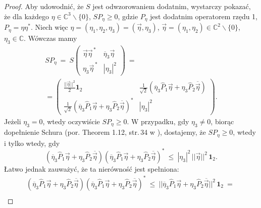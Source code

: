 \begin{proof}
Aby udowodnić, że $S$ jest odwzorowaniem dodatnim,
wystarczy pokazać, że dla każdego $\eta \in \mathbb{C}^{3}\backslash\{0\}$,
$SP_{\eta} \geq 0$,
gdzie $P_{\eta}$ jest dodatnim operatorem rzędu 1,
$P_{\eta} = \eta \eta^{*}$.
Niech więc
$\eta = (\eta_{1}, \eta_{2}, \eta_{3}) = (\vec{\eta}, \eta_{3})$,
$\vec{\eta} = (\eta_{1}, \eta_{2}) \in \mathbb{C}^{2}\backslash\{0\}$,
$\eta_{3} \in \mathbb{C}$.
Wówczas mamy
\begin{multline}
 SP_{\eta} \:=\:  S \begin{pmatrix}
    \vec{\eta} \vec{\eta}^{\,*} & \overline{\eta}_{3} \vec{\eta} \\
    \eta_{3} \vec{\eta}^{\,*}   & |\eta_{3}|^{2}
 \end{pmatrix} \: = \: \\
 = \begin{pmatrix}
  \frac{||\vec{\eta}||^{2}}{2} \mathbf{1}_{2} &
        \frac{1}{\sqrt{2}} \left ( \overline{\eta}_{3} \hat{P}_{1} \vec{\eta} +
          \eta_{3} \hat{P}_{2} \overline{\vec{\eta}} \right) \\
\frac{1}{\sqrt{2}} \left ( \overline{\eta}_{3} \hat{P}_{1} \vec{\eta} +
          \eta_{3} \hat{P}_{2} \overline{\vec{\eta}} \right)^{*} &
        |\eta_{3}|^{2}
 \end{pmatrix}.
\end{multline}
Jeżeli $\eta_{3} = 0$, wtedy oczywiście $SP_{\eta} \geq 0$.
W przypadku, gdy $\eta_{3} \neq 0$,
biorąc dopełnienie Schura
(por. Theorem 1.12, str.\,34 w \cite{Zhang2006}),
dostajemy, że $SP_{\eta} \geq 0$, wtedy i tylko wtedy, gdy
\begin{equation}
\label{ieq:SchurForS}
   \left ( \overline{\eta}_{3} \hat{P}_{1} \vec{\eta} +
    \eta_{3} \hat{P}_{2} \overline{\vec{\eta}} \right)
   \left ( \overline{\eta}_{3} \hat{P}_{1} \vec{\eta} +
    \eta_{3} \hat{P}_{2} \overline{\vec{\eta}} \right)^{*}
    \: \leq \:
        |\eta_{3}|^{2} \, ||\vec{\eta}||^{2} \, \mathbf{1}_{2}.
\end{equation}
Łatwo jednak zauważyć, że ta nierówność jest spełniona:
\begin{multline}
   \left ( \overline{\eta}_{3} \hat{P}_{1} \vec{\eta} +
    \eta_{3} \hat{P}_{2} \overline{\vec{\eta}} \right)
   \left ( \overline{\eta}_{3} \hat{P}_{1} \vec{\eta} +
    \eta_{3} \hat{P}_{2} \overline{\vec{\eta}} \right)^{*} \: \leq \:
|| \overline{\eta}_{3} \hat{P}_{1} \vec{\eta} +
    \eta_{3} \hat{P}_{2}\overline{\vec{\eta}} ||^{2} \, \mathbf{1}_{2}
    \: = \: \\

\end{multline}
\end{proof}
